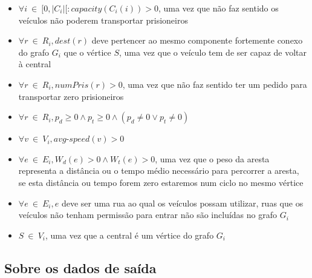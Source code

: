 \documentclass[article, a4paper, 12pt, oneside]{memoir}
\begin{document}
\begin{itemize}
	\item $\forall i ~ \in ~ [0, \vert C_i \vert [: capacity(C_i(i)) > 0$, uma vez que não faz sentido os veículos não poderem transportar prisioneiros
	\item $\forall r ~ \in ~ R_i, dest(r)$ deve pertencer ao mesmo componente fortemente conexo do grafo $G_i$ que o vértice $S$, uma vez que o veículo tem de ser capaz de voltar à central
	\item $\forall r ~ \in ~ R_i, numPris(r) > 0$, uma vez que não faz sentido ter um pedido para transportar zero prisioneiros
	\item $\forall r ~ \in ~ R_i, p_d \geq 0 \wedge p_t \geq 0 \wedge (p_d \neq 0 \vee p_t \neq 0)$
	\item $\forall v ~ \in ~ V_i, avg$-$speed(v) > 0$
	\item $\forall e ~ \in ~ E_i, W_d(e) > 0 \wedge W_t(e) > 0$, uma vez que o peso da aresta representa a distância ou o tempo médio necessário para percorrer a aresta, se esta distância ou tempo forem zero estaremos num ciclo no mesmo vértice
	\item $\forall e ~ \in ~ E_i, e$ deve ser uma rua ao qual os veículos possam utilizar, ruas que os veículos não tenham permissão para entrar não são incluídas no grafo $G_i$
	\item $S ~ \in ~ V_i$, uma vez que a central é um vértice do grafo $G_i$
\end{itemize}

\subsection{Sobre os dados de saída}
\end{document}
